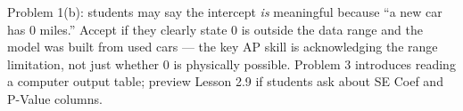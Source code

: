 \documentclass[10pt]{article}
\begin{document}
\begin{teachernote}
Problem 1(b): students may say the intercept \emph{is} meaningful because ``a new car has
0 miles.'' Accept if they clearly state 0 is outside the data range and the model was built
from used cars --- the key AP skill is acknowledging the range limitation, not just whether
0 is physically possible. Problem 3 introduces reading a computer output table; preview
Lesson 2.9 if students ask about SE Coef and P-Value columns.
\end{teachernote}
\end{document}
